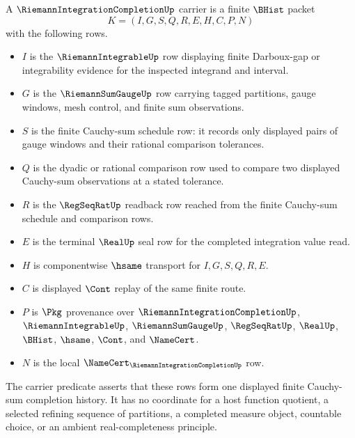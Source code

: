 \begin{definition}
\label{def:riemann-integration-completion-carrier}
A $\RiemannIntegrationCompletionUp$ carrier is a finite $\BHist$ packet
$$
K=(I,G,S,Q,R,E,H,C,P,N)
$$
with the following rows.
\begin{itemize}
\item $I$ is the $\RiemannIntegrableUp$ row displaying finite Darboux-gap or integrability evidence for the inspected integrand and interval.
\item $G$ is the $\RiemannSumGaugeUp$ row carrying tagged partitions, gauge windows, mesh control, and finite sum observations.
\item $S$ is the finite Cauchy-sum schedule row: it records only displayed pairs of gauge windows and their rational comparison tolerances.
\item $Q$ is the dyadic or rational comparison row used to compare two displayed Cauchy-sum observations at a stated tolerance.
\item $R$ is the $\RegSeqRatUp$ readback row reached from the finite Cauchy-sum schedule and comparison rows.
\item $E$ is the terminal $\RealUp$ seal row for the completed integration value read.
\item $H$ is componentwise $\hsame$ transport for $I,G,S,Q,R,E$.
\item $C$ is displayed $\Cont$ replay of the same finite route.
\item $P$ is $\Pkg$ provenance over $\RiemannIntegrationCompletionUp$, $\RiemannIntegrableUp$, $\RiemannSumGaugeUp$, $\RegSeqRatUp$, $\RealUp$, $\BHist$, $\hsame$, $\Cont$, and $\NameCert$.
\item $N$ is the local $\NameCert_{\RiemannIntegrationCompletionUp}$ row.
\end{itemize}
The carrier predicate asserts that these rows form one displayed finite Cauchy-sum completion history. It has no coordinate for a host function quotient, a selected refining sequence of partitions, a completed measure object, countable choice, or an ambient real-completeness principle.
\end{definition}

